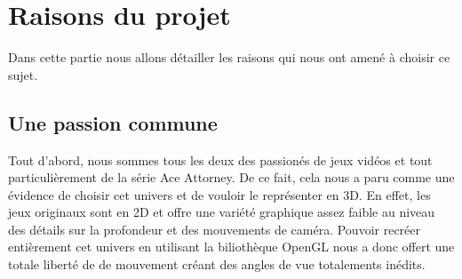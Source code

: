 \section{Raisons du projet}
	Dans cette partie nous allons détailler les raisons qui nous ont amené à choisir ce sujet.\newline

\subsection{Une passion commune}

	Tout d'abord, nous sommes tous les deux des passionés de jeux vidéos et tout particulièrement de la série Ace Attorney. De ce fait, cela nous a paru comme une évidence de choisir cet univers et de vouloir le représenter en 3D. En effet, les jeux originaux sont en 2D et offre une variété graphique assez faible au niveau des détails sur la profondeur et des mouvements de caméra. Pouvoir recréer entièrement cet univers en utilisant la biliothèque OpenGL nous a donc offert une totale liberté de de mouvement créant des angles de vue totalements inédits.
